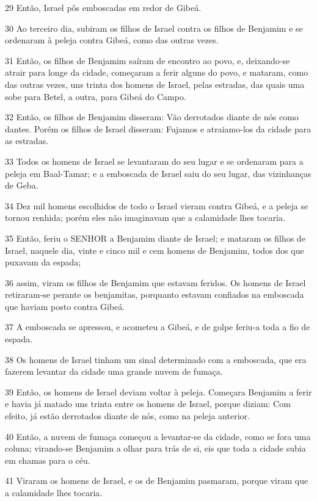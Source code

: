 \par 29 Então, Israel pôs emboscadas em redor de Gibeá.
\par 30 Ao terceiro dia, subiram os filhos de Israel contra os filhos de Benjamim e se ordenaram à peleja contra Gibeá, como das outras vezes.
\par 31 Então, os filhos de Benjamim saíram de encontro ao povo, e, deixando-se atrair para longe da cidade, começaram a ferir alguns do povo, e mataram, como das outras vezes, uns trinta dos homens de Israel, pelas estradas, das quais uma sobe para Betel, a outra, para Gibeá do Campo.
\par 32 Então, os filhos de Benjamim disseram: Vão derrotados diante de nós como dantes. Porém os filhos de Israel disseram: Fujamos e atraiamo-los da cidade para as estradas.
\par 33 Todos os homens de Israel se levantaram do seu lugar e se ordenaram para a peleja em Baal-Tamar; e a emboscada de Israel saiu do seu lugar, das vizinhanças de Geba.
\par 34 Dez mil homens escolhidos de todo o Israel vieram contra Gibeá, e a peleja se tornou renhida; porém eles não imaginavam que a calamidade lhes tocaria.
\par 35 Então, feriu o SENHOR a Benjamim diante de Israel; e mataram os filhos de Israel, naquele dia, vinte e cinco mil e cem homens de Benjamim, todos dos que puxavam da espada;
\par 36 assim, viram os filhos de Benjamim que estavam feridos. Os homens de Israel retiraram-se perante os benjamitas, porquanto estavam confiados na emboscada que haviam posto contra Gibeá.
\par 37 A emboscada se apressou, e acometeu a Gibeá, e de golpe feriu-a toda a fio de espada.
\par 38 Os homens de Israel tinham um sinal determinado com a emboscada, que era fazerem levantar da cidade uma grande nuvem de fumaça.
\par 39 Então, os homens de Israel deviam voltar à peleja. Começara Benjamim a ferir e havia já matado uns trinta entre os homens de Israel, porque diziam: Com efeito, já estão derrotados diante de nós, como na peleja anterior.
\par 40 Então, a nuvem de fumaça começou a levantar-se da cidade, como se fora uma coluna; virando-se Benjamim a olhar para trás de si, eis que toda a cidade subia em chamas para o céu.
\par 41 Viraram os homens de Israel, e os de Benjamim pasmaram, porque viram que a calamidade lhes tocaria.
